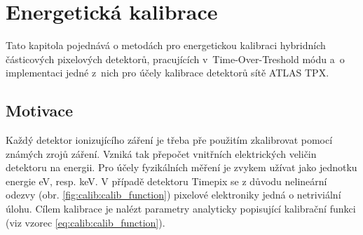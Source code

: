 

\chapter{Energetická kalibrace}\label{calib}
Tato kapitola pojednává o metodách pro energetickou kalibraci hybridních částicových pixelových detektorů, pracujících v~Time-Over-Treshold módu a~o implementaci jedné z~nich pro účely kalibrace detektorů sítě ATLAS TPX.

\section{Motivace}

Každý detektor ionizujícího záření je třeba pře použitím zkalibrovat pomocí známých zrojů záření. Vzniká tak přepočet vnitřních elektrických veličin detektoru na energii. Pro účely fyzikálních měření je zvykem užívat jako jednotku energie eV, resp. keV. 
V případě detektoru Timepix se z důvodu nelineární odezvy (obr. \ref{fig:calib:calib_function}) pixelové elektroniky jedná o netriviální úlohu. Cílem kalibrace je nalézt parametry analyticky popisující kalibrační funkci (viz vzorec \ref{eq:calib:calib_function}).

